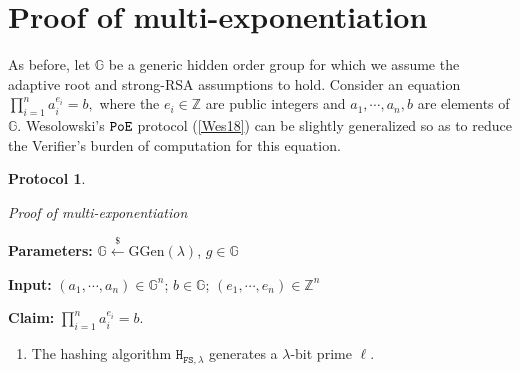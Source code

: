 \documentclass[11pt, lettersize, notitlepage, leqno, footskip=0.6cm]{article}
\newcommand{\bz}{\mathbb Z}
\newcommand{\ttt}{\texttt}
\newcommand{\bG}{\mathbb{G}}
\newcommand{\wti}{\widetilde}
\newcommand{\mc}{\mathcal}
\newcommand{\mb}{\mathbb}
\newcommand{\mbf}{\mathbf}
\newcommand{\mr}{\mathrm}
\newcommand{\lam}{\lambda}
\newcommand{\lamb}{\lambda}
\newcommand{\bO}{\mbf{O}}
\newcommand{\mP}{\mc{P}}
\newcommand{\V}{\mc{V}}
\newcommand{\mcM}{\mc{M}}
\newcommand{\vs}{\vspace{-0.15cm}}
\newcommand{\noin}{\noindent}
\newtheorem{Prot}[Thm]{Protocol}
\numberwithin{equation}{section}
\begin{document}
{{{\begin{comment}
\noin 8. $\mP$ computes $\wti{g}_0 := g^{\wti{e}}$ and sends $\wti{g}_0$ to $\V$ along with a non-interactive proof for \vs $$\ttt{PoGCD}[(g, \wti{A}),\;(g,g_1),\;(g,\wti{g}_0)].$$

\noin 9. $\mP$ generates a non-interactive proof for $\ttt{PoKE}[\wti{g}_0,\; g_2] .$ and sends it to $\V$.

\noin 10. $\V$ verifies all the proofs he receives and accepts if and only if they are all valid. \end{prf1}

\noin The proof consists of a constant number of $\bG$-elements and $\bO(n)$ $\lam$-bit integers. As was the case with the protocol for multiset intersections, the proof is simpler in special cases such as when the elements of every $\mcM_i$ are all primes $> 2^{\lam-1}$.


\end{comment}

\newpage







\section{\fontsize{11}{11} \selectfont Proof of multi-exponentiation} \label{sec:multexp}

As before, let $\bG$ be a generic hidden order group for which we assume the adaptive root and strong-RSA assumptions to hold. Consider an equation $\prod_{i=1}^n a_i^{e_i} = b,$ where the $e_i\in\bz$ are public integers and $a_1,\cdots,a_n, b$ are elements of $\bG$. Wesolowski's $\tt{PoE}$ protocol (\hyperlink{Wes18}{[Wes18]}) can be slightly generalized so as to reduce the Verifier's burden of computation for this equation. 


\begin{Prot} \hypertarget{PoME}{Proof of multi-exponentiation}\end{Prot} \vspace{-0.3cm}

\noindent \textbf{Parameters:} $\mb{G}\xleftarrow{\$} \mr{GGen}(\lamb)$,\; $g\in \mb{G}$

\noindent \textbf{Input:} $(a_1,\cdots,a_n)\in\bG^n$; $b\in\bG$; $(e_1,\cdots,e_n)\in\bz^n$

\noindent \textbf{Claim:} $\prod_{i=1}^n a_i^{e_i} = b$.

\begin{enumerate}[wide, labelwidth=!, labelindent=0pt]\vs \item The hashing algorithm $\ttt{H}_{\ttt{FS},\lam}$ generates a $\lam$-bit prime $\ell$.


\end{enumerate}}}}
\end{document}
